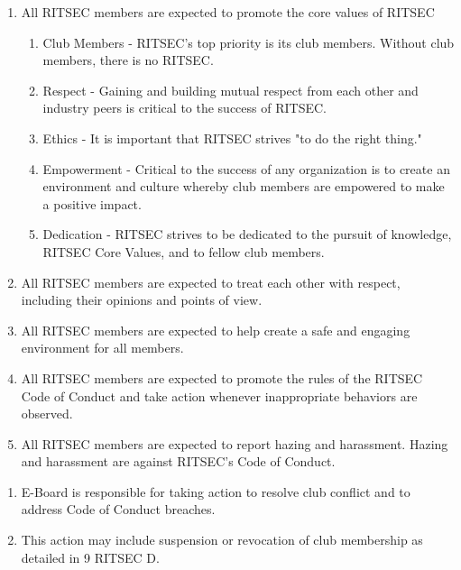 


\begin{enumerate}
  \item All RITSEC members are expected to promote the core values of RITSEC
  \begin{enumerate}
    \item Club Members - RITSEC's top priority is its club members. Without club
      members, there is no RITSEC.
    \item Respect - Gaining and building mutual respect from each other and 
      industry peers is critical to the success of RITSEC.
    \item Ethics - It is important that RITSEC strives "to do the right thing."
    \item Empowerment - Critical to the success of any organization is to
      create an environment and culture whereby club members are empowered to
      make a positive impact.
    \item Dedication - RITSEC strives to be 
      dedicated to the pursuit of knowledge, RITSEC Core Values, and to fellow
      club members.
  \end{enumerate}
  \item All RITSEC members are expected to treat each other with respect,
    including their opinions and points of view.
  \item All RITSEC members are expected to help create a safe and engaging
    environment for all members.
  \item All RITSEC members are expected to promote the rules of the RITSEC Code
    of Conduct and take action whenever inappropriate behaviors are observed.
  \item All RITSEC members are expected to report hazing and harassment. Hazing
    and harassment are against RITSEC’s Code of Conduct.
\end{enumerate}


\begin{enumerate}
  \item E-Board is responsible for taking action to resolve club conflict and
    to address Code of Conduct breaches.
  \item This action may include suspension or revocation of club membership as
    detailed in 9 RITSEC D.
\end{enumerate}

